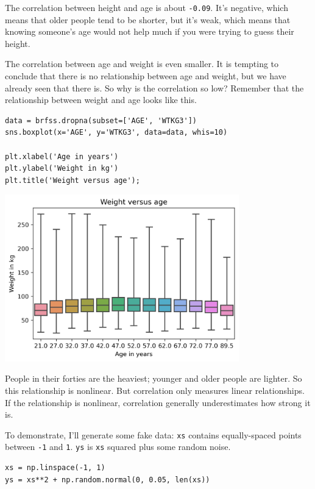 The correlation between height and age is about
\passthrough{\lstinline!-0.09!}. It's negative, which means that older
people tend to be shorter, but it's weak, which means that knowing
someone's age would not help much if you were trying to guess their
height.

The correlation between age and weight is even smaller. It is tempting
to conclude that there is no relationship between age and weight, but we
have already seen that there is. So why is the correlation so low?
Remember that the relationship between weight and age looks like this.

\begin{lstlisting}[]
data = brfss.dropna(subset=['AGE', 'WTKG3'])
sns.boxplot(x='AGE', y='WTKG3', data=data, whis=10)

plt.xlabel('Age in years')
plt.ylabel('Weight in kg')
plt.title('Weight versus age');
\end{lstlisting}

\begin{center}
\includegraphics[width=4in]{chapters/09_relationships_files/09_relationships_58_0.png}
\end{center}

People in their forties are the heaviest; younger and older people are
lighter. So this relationship is nonlinear. But correlation only
measures linear relationships. If the relationship is nonlinear,
correlation generally underestimates how strong it is.

To demonstrate, I'll generate some fake data:
\passthrough{\lstinline!xs!} contains equally-spaced points between
\passthrough{\lstinline!-1!} and \passthrough{\lstinline!1!}.
\passthrough{\lstinline!ys!} is \passthrough{\lstinline!xs!} squared
plus some random noise.

\begin{lstlisting}[]
xs = np.linspace(-1, 1)
ys = xs**2 + np.random.normal(0, 0.05, len(xs))
\end{lstlisting}

